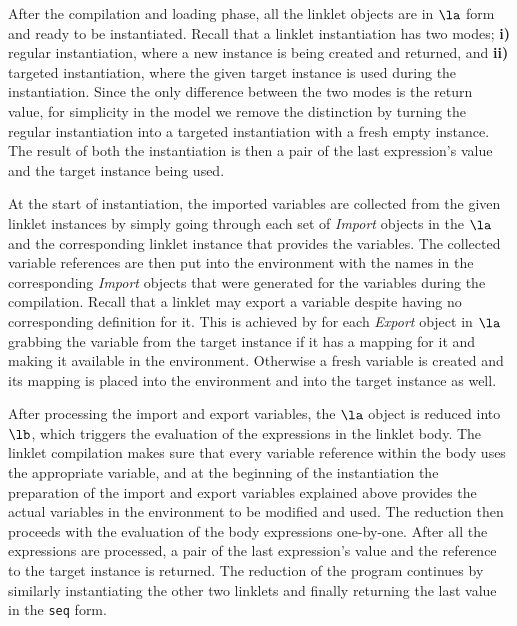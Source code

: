 		\begin{paragraph-here}
			After the compilation and loading phase, all the linklet objects are
			in $\la$ form and ready to be instantiated. Recall that a linklet
			instantiation has two modes; \textbf{i)} regular instantiation, where
			a new instance is being created and returned, and \textbf{ii)}
			targeted instantiation, where the given target instance is used during
			the instantiation. Since the only difference between the two modes is
			the return value, for simplicity in the model we remove the
			distinction by turning the regular instantiation into a targeted
			instantiation with a fresh empty instance. The result of both the
			instantiation is then a pair of the last expression's value and the
			target instance being used.
		\end{paragraph-here}

		\begin{paragraph-here}
			At the start of instantiation, the imported variables are collected
			from the given linklet instances by simply going through each set of
			\emph{Import} objects in the $\la$ and the corresponding linklet
			instance that provides the variables. The collected variable
			references are then put into the environment with the names in the
			corresponding \emph{Import} objects that were generated for the
			variables during the compilation. Recall that a linklet may export a
			variable despite having no corresponding definition for it. This is
			achieved by for each \emph{Export} object in $\la$ grabbing the
			variable from the target instance if it has a mapping for it and
			making it available in the environment. Otherwise a fresh variable is
			created and its mapping is placed into the environment and into the
			target instance as well.
		\end{paragraph-here}

		\begin{paragraph-here}
			After processing the import and export variables, the $\la$ object is
			reduced into $\lb$, which triggers the evaluation of the expressions
			in the linklet body. The linklet compilation makes sure that every
			variable reference within the body uses the appropriate variable, and
			at the beginning of the instantiation the preparation of the import
			and export variables explained above provides the actual variables in
			the environment to be modified and used. The reduction then proceeds
			with the evaluation of the body expressions one-by-one. After all the
			expressions are processed, a pair of the last expression's value and
			the reference to the target instance is returned. The reduction of the
			program continues by similarly instantiating the other two linklets
			and finally returning the last value in the
			\verb|seq| form.
		\end{paragraph-here}

